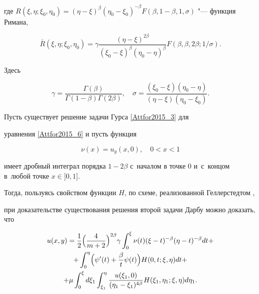 где $R(\xi,\eta;\xi_0,\eta_0)=(\eta-\xi)^\beta(\eta_0-\xi_0)^{-\beta}

F(\beta , 1-\beta, 1, \sigma)$ "--- функция Римана,

$$

\bar{R}(\xi,\eta;\xi_0,\eta_0)=

\gamma\frac{(\eta-\xi)^{2\beta}}{(\xi_0-\xi)^\beta(\eta_0-\eta)^\beta}

F\left(\beta,\beta, 2\beta; {1}/{\sigma}\right).

$$

Здесь

$$

\gamma=\frac{\Gamma(\beta)}{\Gamma(1-\beta)\Gamma(2\beta)},\quad 

\sigma=\frac{(\xi_0-\xi)(\eta_0-\eta)}{(\eta-\xi)(\eta_0-\xi_0)}.

$$



Пусть существует решение задачи Гурса \eqref{Attfor2015_3} для 

уравнения \eqref{Attfor2015_6} и пусть функция

$$

\nu(x)=u_y(x , 0),\quad 0<x<1

$$

имеет дробный интеграл порядка $1-2\beta$ с~началом в точке $0$ и~с~концом в~любой точке $x\in{}]0 , 1]$. 

Тогда, пользуясь свойством функции $H$, по схеме, реализованной Геллерстедтом \cite{Attfor2015_lit_02},

при доказательстве существования решения второй задачи Дарбу можно доказать, что 

\begin{multline}

\label{Attfor2015_13}

u(x,y)=\frac{1}{2}\Bigl(\frac{4}{m+2} \Bigr)^{2\beta}\gamma

 \int _0^\xi \nu(t)(\xi-t)^{-\beta}(\eta-t)^{-\beta}dt+

\\

+ \int _0^\eta \Bigl( \psi'(t)+\frac{\beta}{t}\psi(t) \Bigr)

H(0, t;\xi,\eta) dt + \\

+\mu \int _0^\xi d\xi_1  \int _{\xi_1}^\eta

\frac{u(\xi_1 , 0)}{(\eta_1-\xi_1)^{4\beta}} H(\xi_1,\eta_1;\xi,\eta) d\eta_1.

\end{multline}







